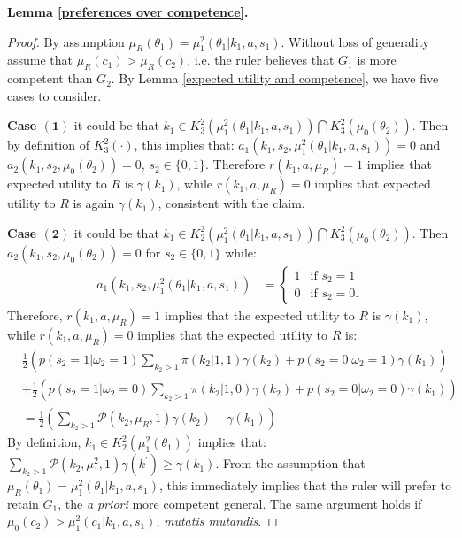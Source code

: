 \documentclass[11pt,]{article}
\begin{document}
\noindent\textbf{Lemma \ref{preferences over competence}.}
\begin{proof}By assumption $\mu_R(\theta_1)=\mu_1^2(\theta_1|k_1,a,s_1)$.  Without loss of generality assume that $\mu_R(c_1)>\mu_R(c_2)$, i.e. the ruler believes that $G_1$ is more competent than $G_2$.  By Lemma \ref{expected utility and competence}, we have five cases to consider.  

\noindent\textbf{Case $\mathbf{(1)}$} it could be that $k_1\in K^2_3(\mu_1^2(\theta_1|k_1,a,s_1))\bigcap K^2_3(\mu_0(\theta_2))$.  Then by definition of $K^2_3(\cdot)$, this implies that: $a_1(k_1,s_2,\mu_1^2(\theta_1|k_1,a,s_1))=0$ and $a_2(k_1,s_2,\mu_0(\theta_2))=0$, $s_2\in\{0,1\}$.  Therefore $r(k_1,a,\mu_R)=1$ implies that expected utility to $R$ is $\gamma(k_1)$, while $r(k_1,a,\mu_R)=0$ implies that expected utility to $R$ is again $\gamma(k_1)$, consistent with the claim.  

\noindent\textbf{Case $\mathbf{(2)}$} it could be that $k_1\in K^2_2(\mu_1^2(\theta_1|k_1,a,s_1))\bigcap K^2_3(\mu_0(\theta_2))$.  Then $a_2(k_1,s_2,\mu_0(\theta_2))=0$ for $s_2\in\{0,1\}$ while:
\begin{align*}
a_1(k_1,s_2,\mu_1^2(\theta_1|k_1,a,s_1))&=\left\{\begin{array}{ll}
1&\mbox{if }s_2=1\\
0&\mbox{if }s_2=0.
\end{array}\right.
\end{align*}Therefore, $r(k_1,a,\mu_R)=1$ implies that the expected utility to $R$ is $\gamma(k_1)$, while $r(k_1,a,\mu_R)=0$ implies that the expected utility to $R$ is:
\begin{align*}
&\frac{1}{2}\left(p(s_2=1|\omega_2=1)\sum_{k_2>1}\pi(k_2|1,1)\gamma(k_2)+p(s_2=0|\omega_2=1)\gamma(k_1)\right)\\
&+\frac{1}{2}\left(p(s_2=1|\omega_2=0)\sum_{k_2>1}\pi(k_2|1,0)\gamma(k_2)+p(s_2=0|\omega_2=0)\gamma(k_1)\right)\\
&=\frac{1}{2}\left(\sum_{k_2>1}\mathcal{P}(k_2,\mu_R,1)\gamma(k_2)+\gamma(k_1)\right)
\end{align*}By definition, $k_1\in K^2_2(\mu_1^2(\theta_1))$ implies that: $\sum_{k_2>1}\mathcal{P}(k_2,\mu_1^2,1)\gamma(k^{\prime})\geq\gamma(k_1)$.  From the assumption that $\mu_R(\theta_1)=\mu_1^2(\theta_1|k_1,a,s_1)$, this immediately implies that the ruler will prefer to retain $G_1$, the \textit{a priori} more competent general.  The same argument holds if $\mu_0(c_2)>\mu_1^2(c_1|k_1,a,s_1)$, \textit{mutatis mutandis}.  


\end{proof}
\end{document}
